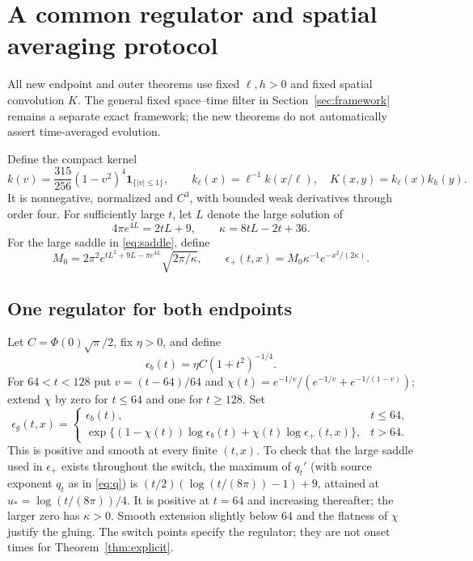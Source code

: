 \section{A common regulator and spatial averaging protocol}\label{sec:protocol}
All new endpoint and outer theorems use fixed $\ell,h>0$ and fixed
spatial convolution $K$. The general fixed space--time filter in
Section~\ref{sec:framework} remains a separate exact framework; the
new theorems do not automatically assert time-averaged evolution.

Define the compact kernel
\begin{equation}
 k(v)=\frac{315}{256}(1-v^2)^4\mathbf1_{\{|v|\le1\}},
 \qquad k_\ell(x)=\ell^{-1}k(x/\ell),\quad
 K(x,y)=k_\ell(x)k_h(y).
 \label{eq:kernel}
\end{equation}
It is nonnegative, normalized and $C^3$, with bounded weak derivatives through order four. 
For sufficiently large $t$, let $L$ denote the large solution of
\begin{equation}
 4\pi e^{4L}=2tL+9,\qquad \kappa=8tL-2t+36 .
 \label{eq:saddle}
\end{equation}
For the large saddle in \eqref{eq:saddle}, define
\begin{equation}
 M_0=2\pi^2e^{tL^2+9L-\pi e^{4L}}\sqrt{2\pi/\kappa},\qquad
 \epsilon_+(t,x)=M_0\kappa^{-1}e^{-x^2/(2\kappa)}.
 \label{eq:positiveRegulator}
\end{equation}

\subsection{One regulator for both endpoints}
Let $C=\Phi(0)\sqrt\pi/2$, fix $\eta>0$, and define
\[
 \epsilon_b(t)=\eta C(1+t^2)^{-1/4}.
\]
For $64<t<128$ put $v=(t-64)/64$ and
$\chi(t)=e^{-1/v}/(e^{-1/v}+e^{-1/(1-v)})$; extend $\chi$ by zero
for $t\le64$ and one for $t\ge128$. Set
\begin{equation}
 \epsilon_g(t,x)=
 \begin{cases}
 \epsilon_b(t),&t\le64,\\
 \exp\{(1-\chi(t))\log\epsilon_b(t)+\chi(t)\log\epsilon_+(t,x)\},
       &t>64.
 \end{cases}
 \label{eq:globalRegulator}
\end{equation}
This is positive and smooth at every finite $(t,x)$.
To check that the large saddle used in $\epsilon_+$ exists throughout
the switch, the maximum of $q_t'$ (with source exponent
$q_t$ as in \eqref{eq:q}) is
$(t/2)(\log(t/(8\pi))-1)+9$, attained at
$u_*=\log(t/(8\pi))/4$.
It is positive at $t=64$ and increasing thereafter; the larger zero
has $\kappa>0$. Smooth extension slightly below $64$ and the flatness
of $\chi$ justify the gluing. The switch points specify the regulator;
they are not onset times for Theorem~\ref{thm:explicit}.

